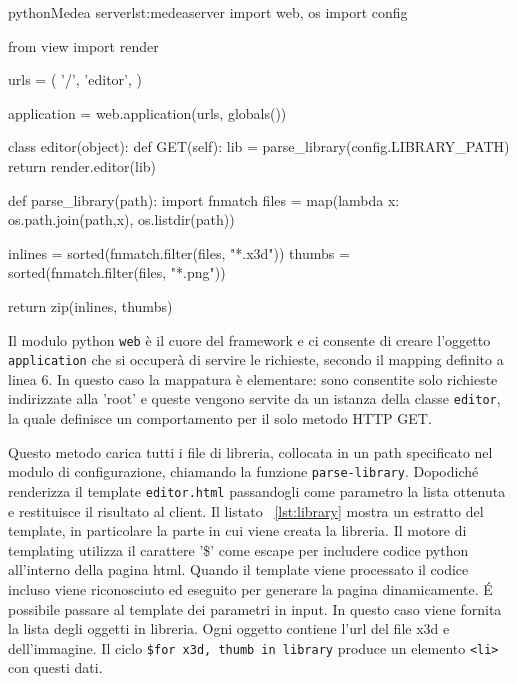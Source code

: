 \begin{mylisting}{python}{Medea server}{lst:medeaserver}
import web, os
import config

from view import render

urls = (
        '/', 'editor',
)

application = web.application(urls, globals())

class editor(object):
    def GET(self):
        lib = parse_library(config.LIBRARY_PATH)
        return render.editor(lib)

def parse_library(path):
    import fnmatch
    files = map(lambda x: os.path.join(path,x), os.listdir(path)) 
    
    inlines = sorted(fnmatch.filter(files, "*.x3d"))
    thumbs = sorted(fnmatch.filter(files, "*.png"))

    return zip(inlines, thumbs)
\end{mylisting}

Il modulo python \texttt{web} è il cuore del framework e ci consente di creare l'oggetto \texttt{application} che si occuperà di servire le richieste, secondo il mapping definito a linea 6. In questo caso la mappatura è elementare: sono consentite solo richieste indirizzate alla 'root' e queste vengono servite da un istanza della classe \texttt{editor}, la quale definisce un comportamento per il solo metodo HTTP GET.

Questo metodo carica tutti i file di libreria, collocata in un path specificato nel modulo di configurazione, chiamando la funzione \texttt{parse-library}. Dopodich\'{e} renderizza il template \texttt{editor.html} passandogli come parametro la lista ottenuta e restituisce il risultato al client. Il listato ~\ref{lst:library} mostra un estratto del template, in particolare la parte in cui viene creata la libreria. Il motore di templating utilizza il carattere '\$' come escape per includere codice python all'interno della pagina html. Quando il template viene processato il codice incluso viene riconosciuto ed eseguito per generare la pagina dinamicamente. \'{E} possibile passare al template dei parametri in input. In questo caso viene fornita la lista degli oggetti in libreria. Ogni oggetto contiene l'url del file x3d e dell'immagine. Il ciclo \texttt{\$for x3d, thumb in library} produce un elemento \texttt{<li>} con questi dati.



